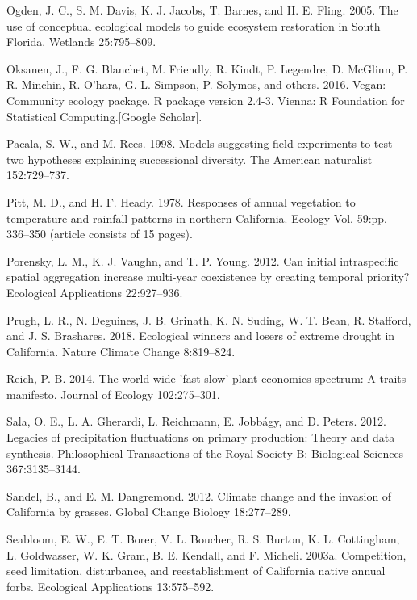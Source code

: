 \documentclass[twoside,12pt,final]{ucthesis-CA2012}
\begin{document}
\begin{ucmainmatter}
\leavevmode\hypertarget{ref-Ogden2005}{}%
Ogden, J. C., S. M. Davis, K. J. Jacobs, T. Barnes, and H. E. Fling. 2005. The use of conceptual ecological models to guide ecosystem restoration in South Florida. Wetlands 25:795--809.

\leavevmode\hypertarget{ref-Oksanen2016}{}%
Oksanen, J., F. G. Blanchet, M. Friendly, R. Kindt, P. Legendre, D. McGlinn, P. R. Minchin, R. O'hara, G. L. Simpson, P. Solymos, and others. 2016. Vegan: Community ecology package. R package version 2.4-3. Vienna: R Foundation for Statistical Computing.{[}Google Scholar{]}.

\leavevmode\hypertarget{ref-Pacala1998}{}%
Pacala, S. W., and M. Rees. 1998. Models suggesting field experiments to test two hypotheses explaining successional diversity. The American naturalist 152:729--737.

\leavevmode\hypertarget{ref-Pitt1978}{}%
Pitt, M. D., and H. F. Heady. 1978. Responses of annual vegetation to temperature and rainfall patterns in northern California. Ecology Vol. 59:pp. 336--350 (article consists of 15 pages).

\leavevmode\hypertarget{ref-Porensky2012}{}%
Porensky, L. M., K. J. Vaughn, and T. P. Young. 2012. Can initial intraspecific spatial aggregation increase multi-year coexistence by creating temporal priority? Ecological Applications 22:927--936.

\leavevmode\hypertarget{ref-Prugh2018}{}%
Prugh, L. R., N. Deguines, J. B. Grinath, K. N. Suding, W. T. Bean, R. Stafford, and J. S. Brashares. 2018. Ecological winners and losers of extreme drought in California. Nature Climate Change 8:819--824.

\leavevmode\hypertarget{ref-Reich2014}{}%
Reich, P. B. 2014. The world-wide 'fast-slow' plant economics spectrum: A traits manifesto. Journal of Ecology 102:275--301.

\leavevmode\hypertarget{ref-Sala2012b}{}%
Sala, O. E., L. A. Gherardi, L. Reichmann, E. Jobbágy, and D. Peters. 2012. Legacies of precipitation fluctuations on primary production: Theory and data synthesis. Philosophical Transactions of the Royal Society B: Biological Sciences 367:3135--3144.

\leavevmode\hypertarget{ref-Sandel2012}{}%
Sandel, B., and E. M. Dangremond. 2012. Climate change and the invasion of California by grasses. Global Change Biology 18:277--289.

\leavevmode\hypertarget{ref-Seabloom2003}{}%
Seabloom, E. W., E. T. Borer, V. L. Boucher, R. S. Burton, K. L. Cottingham, L. Goldwasser, W. K. Gram, B. E. Kendall, and F. Micheli. 2003a. Competition, seed limitation, disturbance, and reestablishment of California native annual forbs. Ecological Applications 13:575--592.


\end{ucmainmatter}
\end{document}
